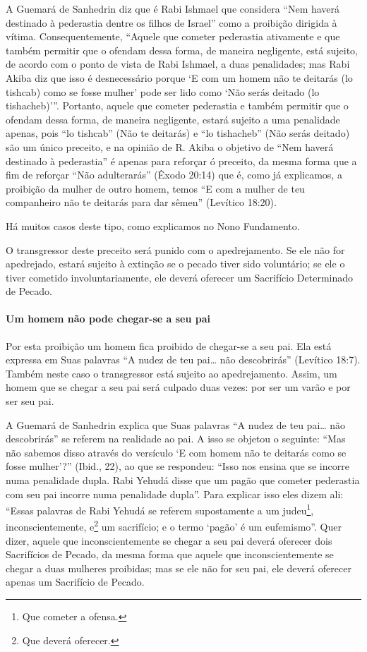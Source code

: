 A Guemará de Sanhedrin diz que é Rabi Ishmael que considera ``Nem haverá
destinado à pederastia dentre os filhos de Israel'' como a proibição
dirigida à vítima. Consequentemente, ``Aquele que cometer pederastia
ativamente e que também permitir que o ofendam dessa forma, de maneira
negligente, está sujeito, de acordo com o ponto de vista de Rabi
Ishmael, a duas penalidades; mas Rabi Akiba diz que isso é
desnecessário porque `E com um homem não te deitarás (lo tishcab) como
se fosse mulher' pode ser lido como `Não serás deitado (lo
tishacheb)'''. Portanto, aquele que cometer pederastia e também permitir que o ofendam dessa forma, de maneira negligente, estará
sujeito a uma penalidade apenas, pois ``lo tishcab'' (Não te deitarás) e
``lo tishacheb'' (Não serás deitado) são um único preceito, e na opinião
de R. Akiba o objetivo de ``Nem haverá destinado à pederastia'' é apenas
para reforçar ó preceito, da mesma forma que a fim de reforçar ``Não
adulterarás'' (Êxodo 20:14) que é, como já explicamos, a proibição da
mulher de outro homem, temos ``E com a mulher de teu companheiro não te
deitarás para dar sêmen'' (Levítico 18:20).

Há muitos casos deste tipo, como explicamos no Nono Fundamento.

O transgressor deste preceito será punido com o apedrejamento. Se ele
não for apedrejado, estará sujeito à extinção se o pecado tiver sido
voluntário; se ele o tiver cometido involuntariamente, ele deverá
oferecer um Sacrifício Determinado de Pecado.

\paragraph{Um homem não pode chegar-se a seu pai}

Por esta proibição um homem fica proibido de chegar-se a seu pai. Ela
está expressa em Suas palavras ``A nudez de teu pai\ldots{} não descobrirás''
(Levítico 18:7). Também neste caso o transgressor está sujeito ao
apedrejamento. Assim, um homem que se chegar a seu pai será culpado duas
vezes: por ser um varão e por ser seu pai.

A Guemará de Sanhedrin explica que Suas palavras ``A nudez de teu pai\ldots{}
não descobrirás'' se referem na realidade ao pai. A isso se objetou o
seguinte: ``Mas não sabemos disso através do versículo `E com homem não
te deitarás como se fosse mulher'?'' (Ibid., 22), ao que se respondeu:
``Isso nos ensina que se incorre numa penalidade dupla. Rabi Yehudá
disse que um pagão que cometer pederastia com seu pai incorre numa
penalidade dupla''. Para explicar isso eles dizem ali: ``Essas palavras
de Rabi Yehudá se referem supostamente a um judeu\footnote{Que cometer a ofensa.},
inconscientemente, e\footnote{Que deverá oferecer.} um sacrifício; e o termo
`pagão' é um eufemismo''. Quer dizer, aquele que inconscientemente se
chegar a seu pai deverá oferecer dois Sacrifícios de Pecado, da mesma
forma que aquele que inconscientemente se chegar a duas mulheres
proibidas; mas se ele não for seu pai, ele deverá oferecer apenas um
Sacrifício de Pecado.

